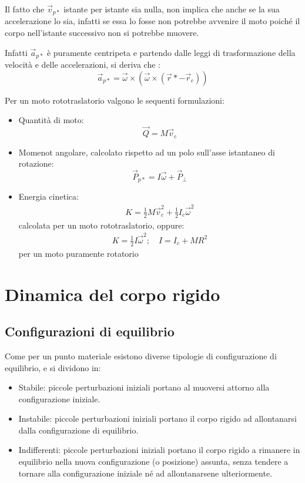 \documentclass[11pt, a4paper, openright]{book}
\theoremstyle{plain}
\theoremstyle{definition}
\begin{document}
Il fatto che $\vec{v}_{p*}$ istante per istante sia nulla, non implica che anche se la sua accelerazione lo sia, infatti se essa lo fosse non potrebbe avvenire il moto poiché il corpo nell'istante successivo non si potrebbe muovere.

Infatti $\vec{a}_{p*}$ è puramente centripeta e partendo dalle leggi di trasformazione della velocità e delle accelerazioni, si deriva che      :
\begin{equation}
    \vec{a}_{p*} = \vec{\omega} \times (\vec{\omega} \times (\vec{r}* - \vec{r}_c))
\end{equation}

Per un moto rototraslatorio valgono le sequenti formulazioni:
\begin{itemize}
    \item Quantità di moto:
    \begin{equation}
        \vec{Q} = M\vec{v}_c    
    \end{equation}
    \item Momenot angolare, calcolato rispetto ad un polo sull'asse istantaneo di rotazione:
    \begin{equation}
        \vec{P}_{p*} = I\vec{\omega} + \vec{P}_\perp    
    \end{equation}
    \item Energia cinetica:
    \begin{align}
        K = \frac{1}{2}M\vec{v}_c^2 + \frac{1}{2}I_c \vec{\omega}^2
    \end{align}
    calcolata per un moto rototraslatorio, oppure:
    \begin{align}
        K = \frac{1}{2}I \vec{\omega}^2; \quad I = I_c + MR^2
    \end{align}
    per un moto puramente rotatorio
\end{itemize}

\section{Dinamica del corpo rigido}


\subsection{Configurazioni di equilibrio}
Come per un punto materiale esistono diverse tipologie di configurazione di equilibrio, e si dividono in:
\begin{itemize}
    \item Stabile: piccole perturbazioni iniziali portano al muoversi attorno alla configurazione iniziale.
    \item Instabile: piccole perturbazioni iniziali portano il corpo rigido ad allontanarsi dalla configurazione di equilibrio.
    \item Indifferenti: piccole perturbazioni iniziali portano il corpo rigido a rimanere in equilibrio nella nuova configurazione (o posizione) assunta, senza tendere a tornare alla configurazione iniziale né ad allontanarsene ulteriormente.
\end{itemize}
\end{document}
